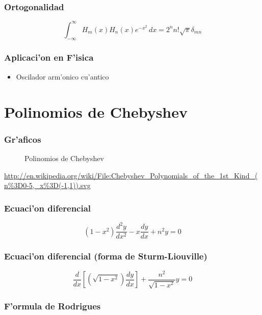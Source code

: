 \subsubsection{Ortogonalidad}
\begin{equation}
\int_{-\infty}^{\infty}H_{m}(x)H_{n}(x)e^{-x^{2}}\,dx=2^{n}n!\sqrt{\pi}\delta_{mn}
\end{equation}

\subsubsection{Aplicaci'on en F'isica}
\begin{itemize}
\item Oscilador arm'onico cu'antico
\end{itemize}

\newpage
\section{Polinomios de Chebyshev}
\subsubsection{Gr'aficos}
\begin{figure}[!h]
\centerline{}
\caption{Polinomios de Chebyshev}
\end{figure}
\url{http://en.wikipedia.org/wiki/File:Chebyshev_Polynomials_of_the_1st_Kind_(n\%3D0-5,_x\%3D(-1,1)).svg}


\subsubsection{Ecuaci'on diferencial}

\begin{equation}
(1-x^{2})\frac{d^{2}y}{dx^{2}}-x\frac{dy}{dx}+n^{2}y=0
\end{equation}

\subsubsection{Ecuaci'on diferencial (forma de Sturm-Liouville)}

\begin{equation}
\frac{d}{dx}\left[\left(\sqrt{1-x^{2}} \right)\frac{dy}{dx}\right]+\frac{n^{2}}{\sqrt{1-x^{2}}}y=0
\end{equation}

\subsubsection{F'ormula de Rodrigues}

